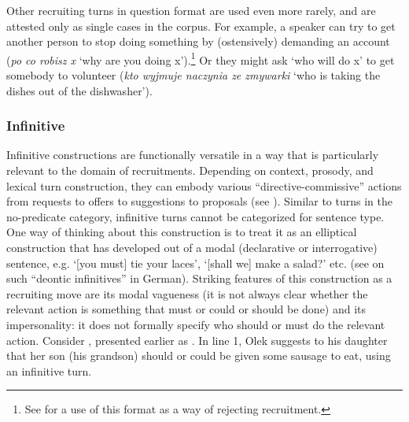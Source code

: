 \documentclass[output=paper]{langsci/langscibook}
\begin{document}
Other recruiting turns in question format are used even more rarely, and are attested only as single cases in the corpus. For example, a speaker can try to get another person to stop doing something by (ostensively) demanding an account (\textit{po co robisz x} `why are you doing x').\footnote{See  for a use of this format as a way of rejecting recruitment.} Or they might ask `who will do x' to get somebody to volunteer (\textit{kto wyjmuje naczynia ze zmywarki} `who is taking the dishes out of the dishwasher').

\subsubsection{Infinitive}\label{sec:zinken:3.3.5}

Infinitive constructions are functionally versatile in a way that is particularly relevant to the domain of recruitments. Depending on context, prosody, and lexical turn construction, they can embody various ``directive-commissive'' actions from requests to offers to suggestions to proposals (see \citealt{couper-kuhlen_what_2014}). Similar to turns in the no-predicate category, infinitive turns cannot be categorized for sentence type. One way of thinking about this construction is to treat it as an elliptical construction that has developed out of a modal (declarative or interrogative) sentence, e.g. ‘[you must] tie your laces’, ‘[shall we] make a salad?’ etc. (see \citealt{Deppermann2006} on such ``deontic infinitives'' in German).  Striking features of this construction as a recruiting move are its modal vagueness (it is not always clear whether the relevant action is something that must or could or should be done) and its impersonality: it does not formally specify who should or must do the relevant action.  Consider , presented earlier as .  In line 1, Olek suggests to his daughter that her son (his grandson) should or could be given some sausage to eat, using an infinitive turn.
\end{document}
